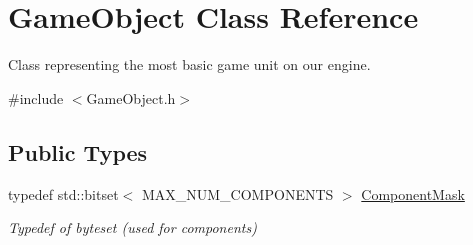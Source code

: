 \hypertarget{classGameObject}{}\section{Game\+Object Class Reference}
\label{classGameObject}


Class representing the most basic game unit on our engine.  




{\ttfamily \#include $<$Game\+Object.\+h$>$}

\subsection*{Public Types}
\begin{DoxyCompactItemize}
\item 
\mbox{\label{classGameObject_aec670daa4bbc9e2956937b0b1b55acbe}} 
typedef std\+::bitset$<$ M\+A\+X\+\_\+\+N\+U\+M\+\_\+\+C\+O\+M\+P\+O\+N\+E\+N\+TS $>$ \hyperlink{classGameObject_aec670daa4bbc9e2956937b0b1b55acbe}{Component\+Mask}
\begin{DoxyCompactList}\small\item\em Typedef of byteset (used for components) \end{DoxyCompactList}\end{DoxyCompactItemize}
